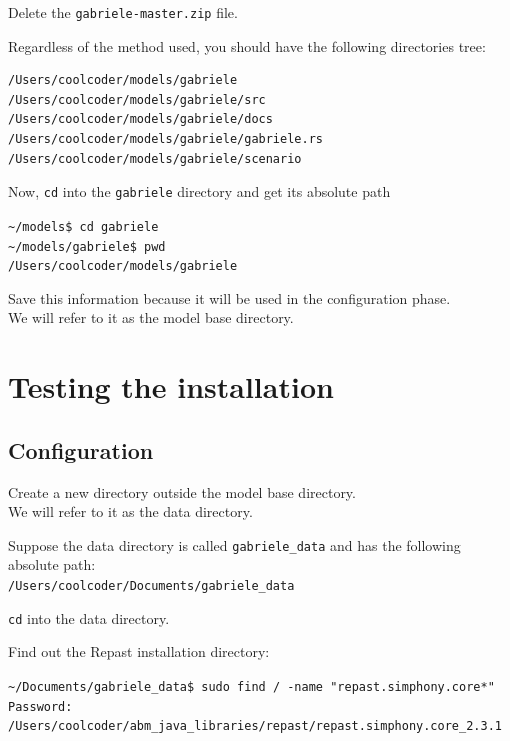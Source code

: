 \documentclass{book}
\begin{document}
Delete the \verb+gabriele-master.zip+ file.

\vskip1cm
Regardless of the method used, you should have the following directories tree: 

\begin{verbatim}
/Users/coolcoder/models/gabriele
/Users/coolcoder/models/gabriele/src
/Users/coolcoder/models/gabriele/docs
/Users/coolcoder/models/gabriele/gabriele.rs
/Users/coolcoder/models/gabriele/scenario
\end{verbatim}

Now, \verb+cd+ into the \verb+gabriele+ directory and get its absolute path  



\vskip2mm
\noindent\verb+~/models$ +\color{red}\verb+cd gabriele+ \color{black}\\
\verb+~/models/gabriele$ +\color{red}\verb+pwd+ \color{blue}\\
\verb+/Users/coolcoder/models/gabriele+
\color{black}
\vskip2mm


Save this information because it will be used in the configuration phase. \\ We will refer to it as the model base directory.

\section{Testing the installation}

\subsection{Configuration}

Create a new directory outside the model base directory. \\ We will refer to it as the data directory.

Suppose the data directory is called \verb+gabriele_data+ and has the following absolute path: \\
\verb+/Users/coolcoder/Documents/gabriele_data+

\verb+cd+ into the data directory.

Find out the Repast installation directory:

\vskip2mm
\noindent\verb+~/Documents/gabriele_data$ +\color{red}\verb+sudo find / -name "repast.simphony.core*"+ \color{black}
\verb+Password:+ \\ \color{blue}
\verb+/Users/coolcoder/abm_java_libraries/repast/repast.simphony.core_2.3.1 +\\
\color{black}
\vskip2mm
\end{document}
